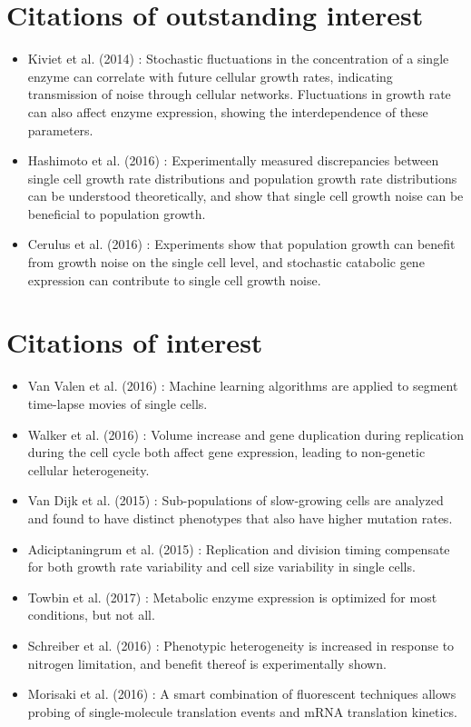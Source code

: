 \section*{Citations of outstanding interest}
\begin{itemize}
\item Kiviet et al. (2014) \cite{Kiviet2014}:
Stochastic fluctuations in the concentration of a single enzyme can correlate with future cellular growth rates, indicating transmission of noise through cellular networks. Fluctuations in growth rate can also affect enzyme expression, showing the interdependence of these parameters.
\item Hashimoto et al. (2016) \cite{Hashimoto2016}:
Experimentally measured discrepancies between single cell growth rate distributions and population growth rate distributions can be understood theoretically, and show that single cell growth noise can be beneficial to population growth.
\item Cerulus et al. (2016) \cite{Cerulus2016}:
Experiments show that population growth can benefit from growth noise on the single cell level, and stochastic catabolic gene expression can contribute to single cell growth noise.
\end{itemize}

\section*{Citations of interest}
\begin{itemize}
    \item Van Valen et al. (2016) \cite{VanValen2016}:
    Machine learning algorithms are applied to segment time-lapse movies of single cells.
    \item Walker et al. (2016) \cite{Walker2016}:
    Volume increase and gene duplication during replication during the cell cycle both affect gene expression, leading to non-genetic cellular heterogeneity.
    \item Van Dijk et al. (2015) \cite{Van Dijk2015}:
    Sub-populations of slow-growing cells are analyzed and found to have distinct phenotypes that also have higher mutation rates.
    \item Adiciptaningrum et al. (2015) \cite{Adiciptaningrum2015}:
    Replication and division timing compensate for both growth rate variability and cell size variability in single cells.
    \item Towbin et al. (2017) \cite{Towbin2017}:
    Metabolic enzyme expression is optimized for most conditions, but not all.
    \item Schreiber et al. (2016) \cite{Schreiber2016}:
    Phenotypic heterogeneity is increased in response to nitrogen limitation, and benefit thereof is experimentally shown.
    \item Morisaki et al. (2016) \cite{Morisaki2016}:
    A smart combination of fluorescent techniques allows probing of single-molecule translation events and mRNA translation kinetics.
\end{itemize}




